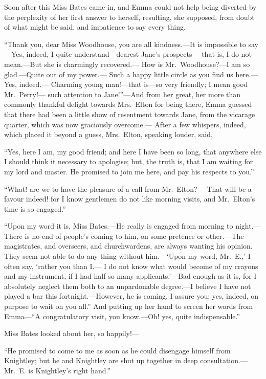 Soon after this Miss Bates came in, and Emma could not help being diverted
by the perplexity of her first answer to herself, resulting, she supposed,
from doubt of what might be said, and impatience to say every thing.

``Thank you, dear Miss Woodhouse, you are all kindness.---It is impossible
to say---Yes, indeed, I quite understand---dearest Jane's prospects---%
that is, I do not mean.---But she is charmingly recovered.---%
How is Mr.\ Woodhouse?---I am so glad.---Quite out of my power.---%
Such a happy little circle as you find us here.---Yes, indeed.---%
Charming young man!---that is---so very friendly; I mean good Mr.\ Perry!---%
such attention to Jane!''---And from her great, her more than commonly
thankful delight towards Mrs.\ Elton for being there, Emma guessed
that there had been a little show of resentment towards Jane,
from the vicarage quarter, which was now graciously overcome.---%
After a few whispers, indeed, which placed it beyond a guess,
Mrs.\ Elton, speaking louder, said,

``Yes, here I am, my good friend; and here I have been so long,
that anywhere else I should think it necessary to apologise;
but, the truth is, that I am waiting for my lord and master.
He promised to join me here, and pay his respects to you.''

``What! are we to have the pleasure of a call from Mr.\ Elton?---%
That will be a favour indeed! for I know gentlemen do not like
morning visits, and Mr.\ Elton's time is so engaged.''

``Upon my word it is, Miss Bates.---He really is engaged from morning
to night.---There is no end of people's coming to him, on some pretence
or other.---The magistrates, and overseers, and churchwardens,
are always wanting his opinion.  They seem not able to do any thing
without him.---`Upon my word, Mr.\ E.,' I often say, `rather you than I.---%
I do not know what would become of my crayons and my instrument,
if I had half so many applicants.'---Bad enough as it is, for I
absolutely neglect them both to an unpardonable degree.---I believe
I have not played a bar this fortnight.---However, he is coming,
I assure you:  yes, indeed, on purpose to wait on you all.''  And putting
up her hand to screen her words from Emma---``A congratulatory visit,
you know.---Oh! yes, quite indispensable.''

Miss Bates looked about her, so happily!---%

``He promised to come to me as soon as he could disengage himself
from Knightley; but he and Knightley are shut up together
in deep consultation.---Mr.\ E. is Knightley's right hand.''

